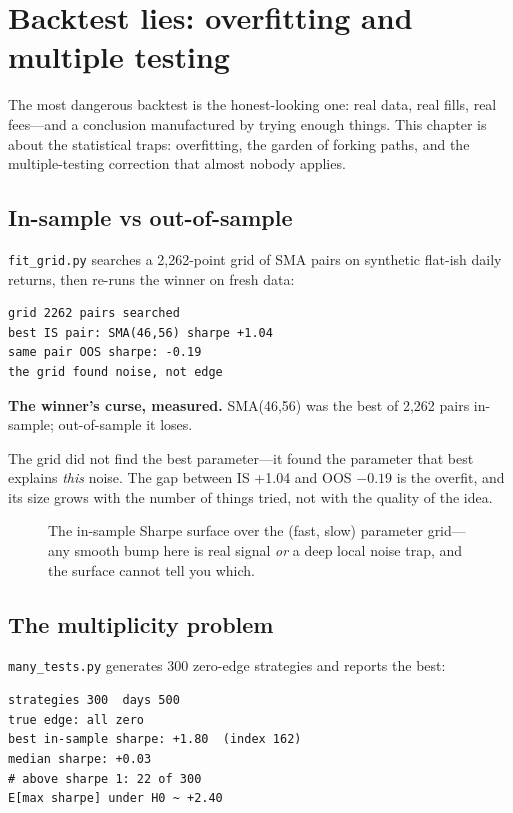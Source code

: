 \chapter{Backtest lies: overfitting and multiple testing}\label{ch:lies}

\noindent The most dangerous backtest is the honest-looking one: real data, real fills, real
fees---and a conclusion manufactured by trying enough things. This chapter is about the
statistical traps: overfitting, the garden of forking paths, and the multiple-testing
correction that almost nobody applies.

\section{In-sample vs out-of-sample}\label{sec:isoos}

\texttt{fit\_grid.py} searches a 2{,}262-point grid of SMA pairs on synthetic flat-ish daily
returns, then re-runs the winner on fresh data:
\begin{lstlisting}[numbers=none]
grid 2262 pairs searched
best IS pair: SMA(46,56) sharpe +1.04
same pair OOS sharpe: -0.19
the grid found noise, not edge
\end{lstlisting}

\begin{example}\label{ex:isoos}
\textbf{The winner's curse, measured.} SMA(46,56) was the best of 2{,}262 pairs in-sample;
out-of-sample it loses.
\begin{solution}
The grid did not find the best parameter---it found the parameter that best explains
\emph{this} noise. The gap between IS +1.04 and OOS $-0.19$ is the overfit, and its size
grows with the number of things tried, not with the quality of the idea.
\end{solution}
\end{example}

\begin{figure}[htbp]\centering

\caption{The in-sample Sharpe surface over the (fast, slow) parameter grid---any smooth
bump here is real signal \emph{or} a deep local noise trap, and the surface cannot tell
you which.}
\label{fig:grid}
\end{figure}

\section{The multiplicity problem}\label{sec:mult}

\texttt{many\_tests.py} generates 300 zero-edge strategies and reports the best:
\begin{lstlisting}[numbers=none]
strategies 300  days 500
true edge: all zero
best in-sample sharpe: +1.80  (index 162)
median sharpe: +0.03
# above sharpe 1: 22 of 300
E[max sharpe] under H0 ~ +2.40
\end{lstlisting}

